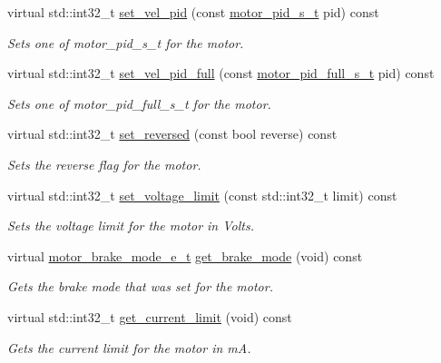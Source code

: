 \begin{DoxyCompactItemize}
virtual std\+::int32\+\_\+t \hyperlink{classpros_1_1Motor_a69169ae0cd2b7f68ee533648c7830397}{set\+\_\+vel\+\_\+pid} (const \hyperlink{motors_8h_ad2e907c8d7ce53c1fd91f1b9801072e3}{motor\+\_\+pid\+\_\+s\+\_\+t} pid) const
\begin{DoxyCompactList}\small\item\em Sets one of motor\+\_\+pid\+\_\+s\+\_\+t for the motor. \end{DoxyCompactList}\item 
virtual std\+::int32\+\_\+t \hyperlink{classpros_1_1Motor_a7fc8eefc04c8b8aaefad75437b49f30a}{set\+\_\+vel\+\_\+pid\+\_\+full} (const \hyperlink{motors_8h_a0295cbf49f5c70c17b5fa962bd25febd}{motor\+\_\+pid\+\_\+full\+\_\+s\+\_\+t} pid) const
\begin{DoxyCompactList}\small\item\em Sets one of motor\+\_\+pid\+\_\+full\+\_\+s\+\_\+t for the motor. \end{DoxyCompactList}\item 
virtual std\+::int32\+\_\+t \hyperlink{classpros_1_1Motor_a44fcc6447ed1416e880232baa16a221e}{set\+\_\+reversed} (const bool reverse) const
\begin{DoxyCompactList}\small\item\em Sets the reverse flag for the motor. \end{DoxyCompactList}\item 
virtual std\+::int32\+\_\+t \hyperlink{classpros_1_1Motor_a3cd7e4ca0714b533d873796cf8b74a81}{set\+\_\+voltage\+\_\+limit} (const std\+::int32\+\_\+t limit) const
\begin{DoxyCompactList}\small\item\em Sets the voltage limit for the motor in Volts. \end{DoxyCompactList}\item 
virtual \hyperlink{motors_8h_aa324a2881696428c9e3684f9ad23a83b}{motor\+\_\+brake\+\_\+mode\+\_\+e\+\_\+t} \hyperlink{classpros_1_1Motor_acc0c2225d2b713b73e1caee1a483a958}{get\+\_\+brake\+\_\+mode} (void) const
\begin{DoxyCompactList}\small\item\em Gets the brake mode that was set for the motor. \end{DoxyCompactList}\item 
virtual std\+::int32\+\_\+t \hyperlink{classpros_1_1Motor_ad2eafcdf16ed480ddcbb80a45b19c01a}{get\+\_\+current\+\_\+limit} (void) const
\begin{DoxyCompactList}\small\item\em Gets the current limit for the motor in mA. \end{DoxyCompactList}\item 

\end{DoxyCompactItemize}
